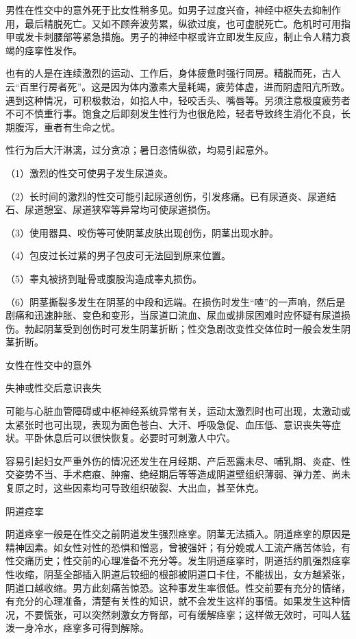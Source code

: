 \documentclass[12pt,UTF8]{ctexbook}
\begin{document}
男性在性交中的意外死于比女性稍多见。如男子过度兴奋，神经中枢失去抑制作用，最后精脱死亡。又如不顾奔波劳累，纵欲过度，也可虚脱死亡。危机时可用指甲或发卡刺腰部等紧急措施。男子的神经中枢或许立即发生反应，制止令人精力衰竭的痉挛性发作。

也有的人是在连续激烈的运动、工作后，身体疲惫时强行同房。精脱而死，古人云“百里行房者死”。这是因为体内激素大量耗竭，疲劳体虚，进而阴虚阳亢所致。遇到这种情况，可积极救治，如掐人中，轻咬舌头、嘴唇等。另须注意极度疲劳者不可不慎重行事。饱食之后即刻发生性行为也很危险，轻者导致终生消化不良，长期腹泻，重者有生命之忧。

性行为后大汗淋漓，过分贪凉；暑日恣情纵欲，均易引起意外。

（1）激烈的性交可使男子发生尿道炎。

（2）长时间的激烈的性交可能引起尿道创伤，引发疼痛。已有尿道炎、尿道结石、尿道憩室、尿道狭窄等异常均可使尿道损伤。

（3）使用器具、咬伤等可使阴茎皮肤出现创伤，阴茎出现水肿。

（4）包皮过长过紧的男子包皮可无法回到原来位置。

（5）睾丸被挤到耻骨或腹股沟造成睾丸损伤。

（6）阴茎撕裂多发生在阴茎的中段和远端。在损伤时发生“喳”的一声响，然后是剧痛和迅速肿胀、变色和变形，当尿道口流血、尿血或排尿困难时应怀疑有尿道损伤。勃起阴茎受到创伤时可发生阴茎折断；性交急剧改变性交体位时一般会发生阴茎折断。





女性在性交中的意外


失神或性交后意识丧失

可能与心脏血管障碍或中枢神经系统异常有关，运动太激烈时也可出现，太激动或太紧张时也可出现，表现为面色苍白、大汗、呼吸急促、血压低、意识丧失等症状。平卧休息后可以很快恢复。必要时可刺激人中穴。

容易引起妇女严重外伤的情况还发生在月经期、产后恶露未尽、哺乳期、炎症、性交姿势不当、手术疤痕、肿瘤、绝经期后等等造成阴道壁组织薄弱、弹力差、尚未复原之时，这些因素均可导致组织破裂、大出血，甚至休克。

阴道痉挛

阴道痉挛一般是在性交之前阴道发生强烈痉挛。阴茎无法插入。阴道痉挛的原因是精神因素。如女性对性的恐惧和憎恶，曾被强奸；有分娩或人工流产痛苦体验，有性交痛历史；性交前的心理准备不充分等。发生阴道痉挛时，阴道括约肌强烈痉挛性收缩，阴茎全部插入阴道后较细的根部被阴道口卡住，不能拔出，女方越紧张，阴道口越收缩。男方此刻痛苦惊恐。这种事发生率很低。性交前要有充分的情绪，有充分的心理准备，清楚有关性的知识，就不会发生这样的事情。如果发生这种情况，不要慌张，可以突然刺激女方臀部，可有缓解痉挛；这样做无效时，可叫人猛泼一身冷水，痉挛多可得到解除。
\end{document}
